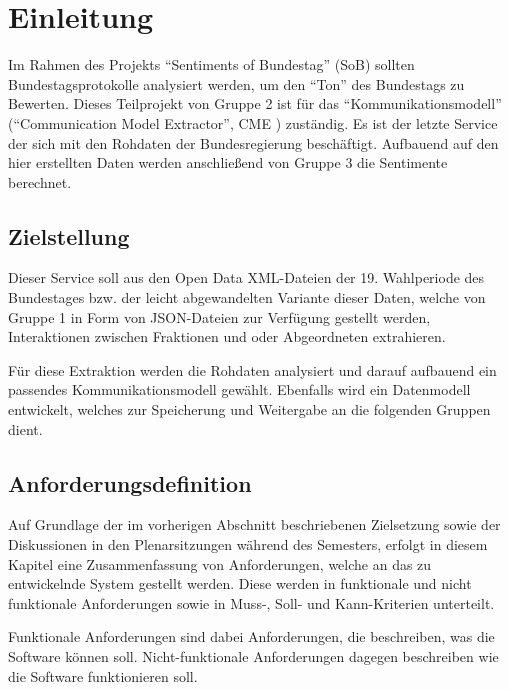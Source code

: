 \section{Einleitung}\label{sec:03_01_einleitung}
Im Rahmen des Projekts \enquote{Sentiments of Bundestag} (SoB)  sollten
Bundestagsprotokolle analysiert werden, um den \enquote{Ton} des Bundestags zu
Bewerten. Dieses Teilprojekt von Gruppe 2 ist für das \enquote{Kommunikationsmodell}
(\enquote{Communication Model Extractor}, CME ) zuständig. Es ist
der letzte Service der sich mit den Rohdaten der Bundesregierung beschäftigt.
Aufbauend auf den hier erstellten Daten werden anschließend von Gruppe 3 die
Sentimente berechnet.

\subsection{Zielstellung}

Dieser Service soll aus den Open Data XML-Dateien der 19. Wahlperiode des
Bundestages bzw. der leicht abgewandelten Variante dieser Daten, welche von
Gruppe 1 in Form von JSON-Dateien zur Verfügung gestellt werden,
Interaktionen zwischen Fraktionen und oder Abgeordneten extrahieren.

Für diese Extraktion werden die Rohdaten analysiert und darauf aufbauend ein
passendes Kommunikationsmodell gewählt. Ebenfalls wird ein Datenmodell
entwickelt, welches zur Speicherung und Weitergabe an die folgenden Gruppen
dient.

\subsection{Anforderungsdefinition}

Auf Grundlage der im vorherigen Abschnitt beschriebenen Zielsetzung sowie der
Diskussionen in den Plenarsitzungen während des Semesters, erfolgt in diesem
Kapitel eine Zusammenfassung von Anforderungen, welche an das zu entwickelnde
System gestellt werden. Diese werden in funktionale und nicht funktionale
Anforderungen sowie in Muss-, Soll- und Kann-Kriterien unterteilt.

Funktionale Anforderungen sind dabei Anforderungen, die beschreiben, was die
Software können soll. Nicht-funktionale Anforderungen dagegen beschreiben wie
die Software funktionieren soll.

